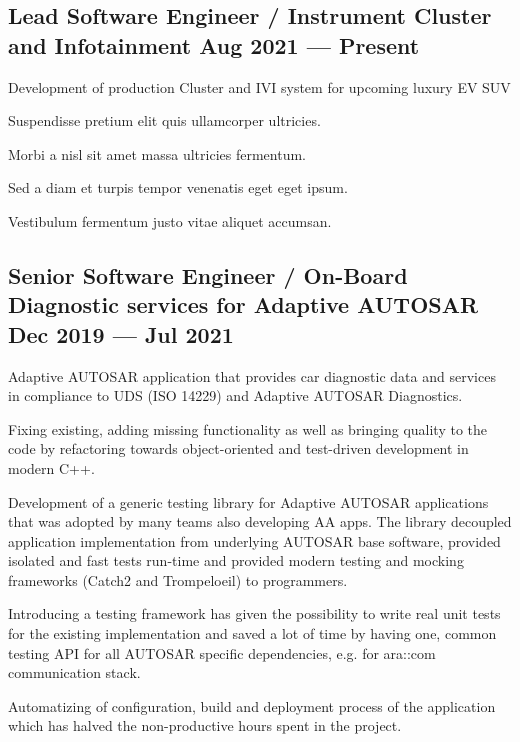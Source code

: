\documentclass[letter,10pt]{article}
\begin{document}
\subsection{{Lead Software Engineer / Instrument Cluster and Infotainment \hfill Aug 2021 --- Present}}
\begin{zitemize}
\item Development of production Cluster and IVI system for upcoming luxury EV SUV
\item Suspendisse pretium elit quis ullamcorper ultricies.
\item Morbi a nisl sit amet massa ultricies fermentum.
\item Sed a diam et turpis tempor venenatis eget eget ipsum.
\item Vestibulum fermentum justo vitae aliquet accumsan.
\end{zitemize}

\subsection{{Senior Software Engineer / On-Board Diagnostic services for Adaptive AUTOSAR \hfill Dec 2019 --- Jul 2021}}
\begin{zitemize}
\item Adaptive AUTOSAR application that provides car diagnostic data and services in compliance to UDS (ISO 14229) and Adaptive AUTOSAR Diagnostics.
\item Fixing existing, adding missing functionality as well as bringing quality to the code by refactoring towards object-oriented and test-driven development in modern C++.
\item Development of a generic testing library for Adaptive AUTOSAR applications that was adopted by many teams also developing AA apps. The library decoupled application implementation from underlying AUTOSAR base software, provided isolated and fast tests run-time and provided modern testing and mocking frameworks (Catch2 and Trompeloeil) to programmers.
\item Introducing a testing framework has given the possibility to write real unit tests for the existing implementation and saved a lot of time by having one, common testing API for all AUTOSAR specific dependencies, e.g. for ara::com communication stack.
\item Automatizing of configuration, build and deployment process of the application which has halved the non-productive hours spent in the project.
\end{zitemize}
\end{document}
